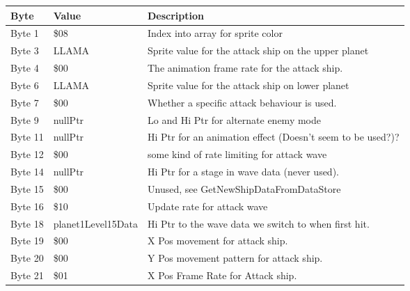\begin{figure}[H]
  {
  \setlength{\tabcolsep}{3.0pt}
  \setlength\cmidrulewidth{\heavyrulewidth} %
  \begin{adjustbox}{width=12cm}

\begin{tabular}{lll}
\toprule
 Byte    & Value              & Description                                                        \\
\midrule
 Byte 1  & \$08                & Index into array for sprite color                                  \\
 Byte 3  & LLAMA              & Sprite value for the attack ship on the upper planet               \\
 Byte 4  & \$00                & The animation frame rate for the attack ship.                      \\
 Byte 6  & LLAMA              & Sprite value for the attack ship on lower planet                   \\
 Byte 7  & \$00                & Whether a specific attack behaviour is used.                       \\
 Byte 9  & nullPtr            & Lo and Hi Ptr for alternate enemy mode                             \\
 Byte 11 & nullPtr            & Hi Ptr for an animation effect (Doesn't seem to be used?)?         \\
 Byte 12 & \$00                & some kind of rate limiting for attack wave                         \\
 Byte 14 & nullPtr            & Hi Ptr for a stage in wave data (never used).                      \\
 Byte 15 & \$00                & Unused, see GetNewShipDataFromDataStore                            \\
 Byte 16 & \$10                & Update rate for attack wave                                        \\
 Byte 18 & planet1Level15Data & Hi Ptr to the wave data we switch to when first hit.               \\
 Byte 19 & \$00                & X Pos movement for attack ship.                                    \\
 Byte 20 & \$00                & Y Pos movement pattern for attack ship.                            \\
 Byte 21 & \$01                & X Pos Frame Rate for Attack ship.                                  \\

\end{tabular}
\end{adjustbox}}
\end{figure}
